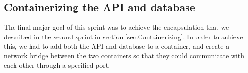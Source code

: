\subsection{Containerizing the API and database}
The final major goal of this sprint was to achieve the encapsulation that we described in the second sprint in section \ref{sec:Containerizing}. 
In order to achieve this, we had to add both the API and database to a container, and create a network bridge between the two containers so that they could communicate with each other through a specified port.